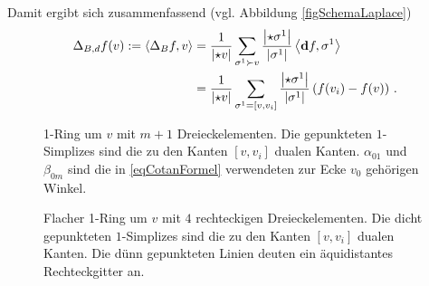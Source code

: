     Damit ergibt sich zusammenfassend (vgl. Abbildung \ref{figSchemaLaplace})\\
    \begin{align}
    \label{eqDiskreteLaplace}
    \begin{aligned}
      \Delta_{B,d} f(v) :=
      \left\langle \Delta_{B} f, v \right\rangle 
          &= \frac{1}{\left| \star v \right|} \sum_{\sigma^{1}\succ v} \frac{\left| \star\sigma^{1} \right|}{\left| \sigma^{1} \right|}
                       \left\langle \mathbf{d} f , \sigma^{1} \right\rangle \\
          &= \frac{1}{\left| \star v \right|} \sum_{\sigma^{1}=\left[ v,v_{i} \right]} \frac{\left| \star\sigma^{1} \right|}{\left| \sigma^{1} \right|}
                       \left( f(v_{i}) - f(v) \right) \,\text{.}
    \end{aligned}
    \end{align}

    \begin{figure}
      \begin{minipage}[t]{0.45\textwidth}
        \centering
        \caption[Schema für Laplace]{1-Ring um \( v \) mit \( m+1 \) Dreieckelementen.
                                     Die gepunkteten \( 1 \)-Simplizes sind die zu den Kanten 
                                     \( \left[ v, v_{i} \right] \) dualen Kanten.
                                     \( \alpha_{01} \) und \( \beta_{0m} \) sind die in \eqref{eqCotanFormel} verwendeten zur Ecke \( v_{0} \) gehörigen Winkel.}
        \label{figSchemaLaplace}
      \end{minipage}
      \hfill
      \begin{minipage}[t]{0.45\textwidth}
        \centering
        \caption[5-Punkte-Stern]{Flacher 1-Ring um \( v \) mit \( 4 \) rechteckigen Dreieckelementen.
                                     Die dicht gepunkteten \( 1 \)-Simplizes sind die zu den Kanten 
                                     \( \left[ v, v_{i} \right] \) dualen Kanten.
                                     Die dünn gepunkteten Linien deuten ein äquidistantes Rechteckgitter an.}
        \label{fig5PunktStern}
      \end{minipage}
    \end{figure}

